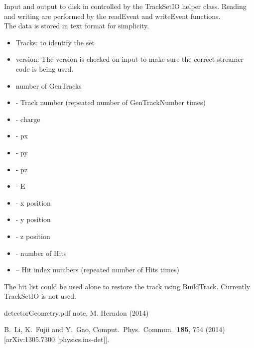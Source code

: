 \documentclass[aps,prd,superscriptaddress,floatfix]{revtex4}
\begin{document}
Input and output to disk in controlled by the TrackSetIO helper class.  Reading and writing
are performed by the readEvent and writeEvent functions.
\\

The data is stored in text format for simplicity.

\begin{itemize}
\item Tracks: to identify the set
\item version: The version is checked on input to make sure the correct streamer code is being used.
\item number of GenTracks
\item - Track number (repeated number of GenTrackNumber times)
\item - charge
\item - px
\item - py
\item - pz
\item - E
\item - x position
\item - y position
\item - z position
\item - number of Hits
\item -- Hit index numbers (repeated number of Hits times)
\end{itemize}

The hit list could be used alone to restore the track using BuildTrack.  Currently TrackSetIO is not used.

\begin{thebibliography}{99}

detectorGeometry.pdf note, M. Herndon (2014)

  B.~Li, K.~Fujii and Y.~Gao,
  Comput.\ Phys.\ Commun.\  {\bf 185}, 754 (2014)
  [arXiv:1305.7300 [physics.ins-det]].


\end{thebibliography}
% 
\end{document}

